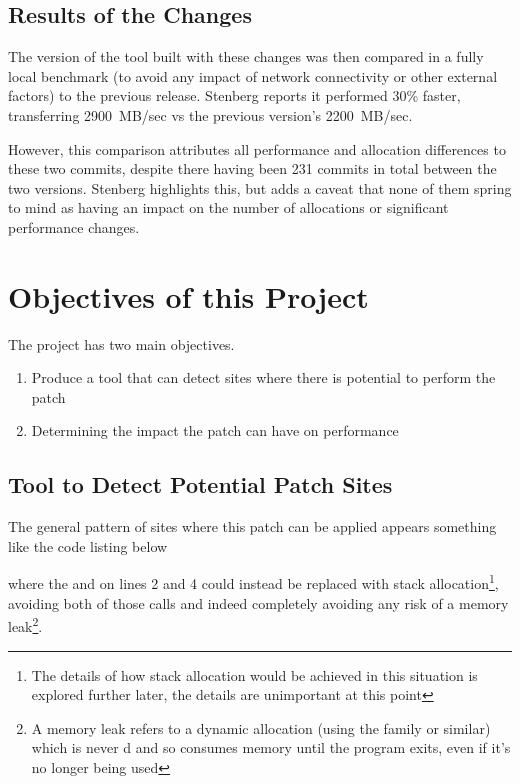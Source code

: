 \subsection{Results of the Changes}

The version of the tool built with these changes was then compared in a fully local benchmark (to avoid any impact of network connectivity or other external factors) to the previous release. Stenberg reports it performed 30\% faster, transferring 2900~MB/sec vs the previous version's 2200~MB/sec.

However, this comparison attributes all performance and allocation differences to these two commits, despite there having been 231 commits in total between the two versions. Stenberg highlights this, but adds a caveat that none of them spring to mind as having an impact on the number of allocations or significant performance changes.

\section{Objectives of this Project}

The project has two main objectives.

\begin{enumerate}
	\item Produce a tool that can detect sites where there is potential to perform the patch
	\item Determining the impact the patch can have on performance
\end{enumerate}

\subsection{Tool to Detect Potential Patch Sites}

The general pattern of sites where this patch can be applied appears something like the code listing below



where the \malloc{} and \free{} on lines 2 and 4 could instead be replaced with stack allocation\footnote{The details of how stack allocation would be achieved in this situation is explored further later, the details are unimportant at this point}, avoiding both of those calls and indeed completely avoiding any risk of a memory leak\footnote{A memory leak refers to a dynamic allocation (using the \malloc{} family or similar) which is never \free{}d and so consumes memory until the program exits, even if it's no longer being used}.

